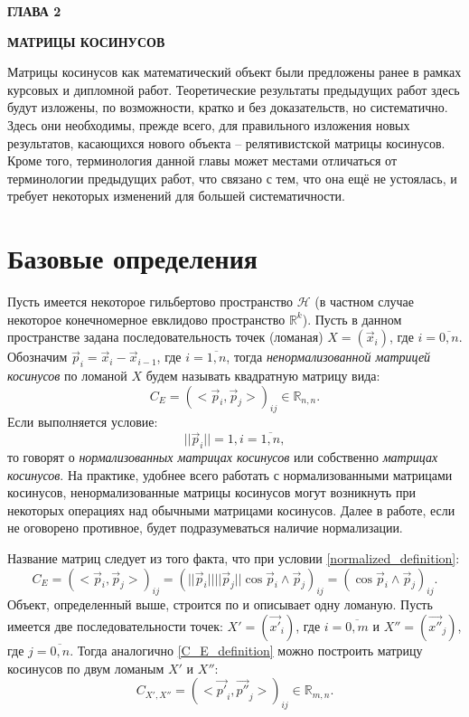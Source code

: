 \newpage
\begin{center}
	\textbf{\large ГЛАВА 2}

	\textbf{\large МАТРИЦЫ КОСИНУСОВ}
\end{center}

Матрицы косинусов как математический объект были предложены ранее в рамках курсовых и дипломной работ. Теоретические результаты предыдущих работ здесь будут изложены, по возможности, кратко и без доказательств, но систематично. Здесь они необходимы, прежде всего, для правильного изложения новых результатов, касающихся нового объекта -- релятивистской матрицы косинусов. Кроме того, терминология данной главы может местами отличаться от терминологии предыдущих работ, что связано с тем, что она ещё не устоялась, и требует некоторых изменений для большей систематичности.

\section{Базовые определения}
Пусть имеется некоторое гильбертово пространство $\mathcal{H}$ (в частном случае некоторое конечномерное евклидово пространство $\mathbb{R}^{k}$).
Пусть в данном пространстве задана последовательность точек (ломаная) $X = (\vec{x}_i)$, где $i = \overline{0,n}$. Обозначим $\vec{p}_{i} = \vec{x}_i - \vec{x}_{i-1}$, где $i = \overline{1,n}$, тогда \textit{ненормализованной матрицей косинусов} по ломаной $X$ будем называть квадратную матрицу вида:
\begin{equation}
	{C}_{E} = {(<\vec{p}_{i}, \vec{p}_{j}>)}_{ij} \in \mathbb{R}_{n,n}.
	\label{C_E_definition}
\end{equation}
Если выполняется условие:
\begin{equation}
	||\vec{p}_{i}|| = 1, i = \overline{1,n},
	\label{normalized_definition}
\end{equation}
то говорят о \textit{нормализованных матрицах косинусов} или собственно \textit{матрицах косинусов}. На практике, удобнее всего работать с нормализованными матрицами косинусов, ненормализованные матрицы косинусов могут возникнуть при некоторых операциях над обычными матрицами косинусов. Далее в работе, если не оговорено противное, будет подразумеваться наличие нормализации. 

Название матриц следует из того факта, что при условии \ref{normalized_definition}:
\begin{equation}
	{C}_{E} = {(<\vec{p}_{i}, \vec{p}_{j}>)}_{ij} = {(||\vec{p}_{i}|| ||\vec{p}_{j}|| \cos{\vec{p}_{i} \wedge \vec{p}_{j}})}_{ij} = {(\cos{\vec{p}_{i} \wedge \vec{p}_{j}})}_{ij}.
	\label{name_cosine}
\end{equation}
Объект, определенный выше, строится по и описывает одну ломаную. Пусть имеется две последовательности точек: $X' = (\vec{x'}_{i})$, где $i = \overline{0,m}$ и $X'' = (\vec{x''}_{j})$, где $j = \overline{0,n}$. Тогда аналогично \ref{C_E_definition} можно построить матрицу косинусов по двум ломаным $X'$ и $X''$:
\begin{equation}
	{C}_{X',X''} = {(<\vec{p'}_{i}, \vec{p''}_{j}>)}_{ij} \in \mathbb{R}_{m,n}.
	\label{C_X1X2_definition}
\end{equation}

